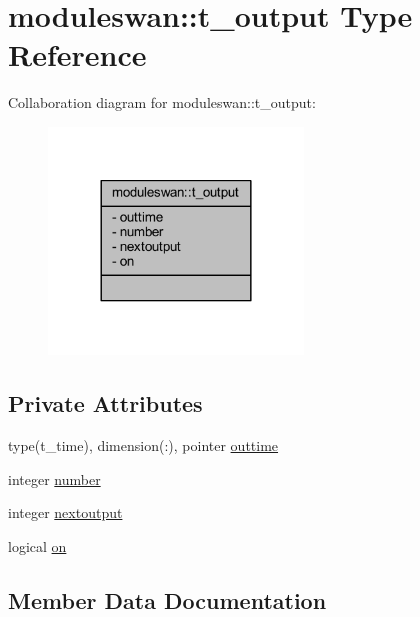 \hypertarget{structmoduleswan_1_1t__output}{}\section{moduleswan\+:\+:t\+\_\+output Type Reference}
\label{structmoduleswan_1_1t__output}


Collaboration diagram for moduleswan\+:\+:t\+\_\+output\+:\nopagebreak
\begin{figure}[H]
\begin{center}
\leavevmode
\includegraphics[width=192pt]{structmoduleswan_1_1t__output__coll__graph}
\end{center}
\end{figure}
\subsection*{Private Attributes}
\begin{DoxyCompactItemize}
\item 
type(t\+\_\+time), dimension(\+:), pointer \mbox{\hyperlink{structmoduleswan_1_1t__output_a19462811f8019ec4fad577469ddf06ae}{outtime}}
\item 
integer \mbox{\hyperlink{structmoduleswan_1_1t__output_a012bef06d6074afffec39a7fe4b9b7a5}{number}}
\item 
integer \mbox{\hyperlink{structmoduleswan_1_1t__output_a8e3cfe6c292e0d7fa3b0bd3f5abc45f4}{nextoutput}}
\item 
logical \mbox{\hyperlink{structmoduleswan_1_1t__output_a99e2fb44f2d95302008c7cae2fe0b825}{on}}
\end{DoxyCompactItemize}


\subsection{Member Data Documentation}
\mbox{\label{structmoduleswan_1_1t__output_a8e3cfe6c292e0d7fa3b0bd3f5abc45f4}} 
